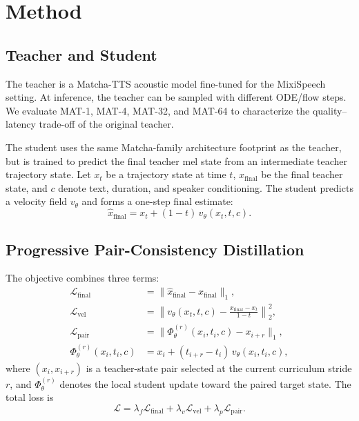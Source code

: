 \documentclass[10pt,twoside]{article}
\newcommand{\mat}{MAT}
\newcommand{\xfinal}{x_{\mathrm{final}}}
\newcommand{\xhat}{\hat{x}_{\mathrm{final}}}
\begin{document}
\endgroup

\section{Method}

\subsection{Teacher and Student}

The teacher is a Matcha-TTS acoustic model fine-tuned for the MixiSpeech
setting. At inference, the teacher can be sampled with different ODE/flow steps.
We evaluate \mat-1, \mat-4, \mat-32, and \mat-64 to characterize the
quality--latency trade-off of the original teacher.

The student uses the same Matcha-family architecture footprint as the teacher,
but is trained to predict the final teacher mel state from an intermediate
teacher trajectory state. Let $x_t$ be a trajectory state at time $t$,
$\xfinal$ be the final teacher state, and $c$ denote text, duration, and speaker
conditioning. The student predicts a velocity field $v_\theta$ and forms a
one-step final estimate:
\begin{equation}
  \xhat = x_t + (1 - t)\, v_\theta(x_t, t, c).
  \label{eq:jump}
\end{equation}

\subsection{Progressive Pair-Consistency Distillation}

The objective combines three terms:
\begin{align}
\mathcal{L}_{\mathrm{final}} &= \|\xhat - \xfinal\|_1, \\
\mathcal{L}_{\mathrm{vel}} &= \left\|v_\theta(x_t,t,c) -
  \frac{\xfinal - x_t}{1-t}\right\|_2^2, \\
\mathcal{L}_{\mathrm{pair}} &= \|\Phi_\theta^{(r)}(x_i,t_i,c) - x_{i+r}\|_1, \\
\Phi_\theta^{(r)}(x_i,t_i,c) &= x_i + (t_{i+r}-t_i)\,
  v_\theta(x_i,t_i,c),
\end{align}
where $(x_i,x_{i+r})$ is a teacher-state pair selected at the current curriculum
stride $r$, and $\Phi_\theta^{(r)}$ denotes the local student update toward the
paired target state. The total loss is
\begin{equation}
  \mathcal{L} =
  \lambda_f\mathcal{L}_{\mathrm{final}} +
  \lambda_v\mathcal{L}_{\mathrm{vel}} +
  \lambda_p\mathcal{L}_{\mathrm{pair}}.
\end{equation}
\end{document}

